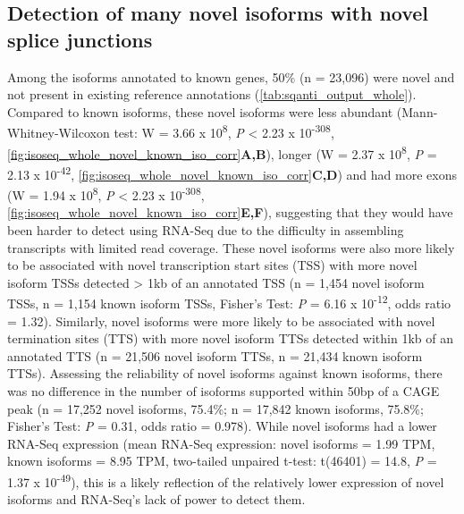 \subsection{Detection of many novel isoforms with novel splice junctions}
\label{sec:whole_novelIso}
Among the isoforms annotated to known genes, 50\% (n = 23,096) were novel and not present in existing reference annotations (\cref{tab:sqanti_output_whole}). Compared to known isoforms, these novel isoforms were less abundant (Mann-Whitney-Wilcoxon test: W = 3.66 x 10\textsuperscript{8}, \textit{P} < 2.23 x 10\textsuperscript{-308}, \cref{fig:isoseq_whole_novel_known_iso_corr}\textbf{A,B}), longer (W = 2.37 x 10\textsuperscript{8}, \textit{P} = 2.13 x 10\textsuperscript{-42}, \cref{fig:isoseq_whole_novel_known_iso_corr}\textbf{C,D}) and had more exons (W = 1.94 x 10\textsuperscript{8}, \textit{P} < 2.23 x 10\textsuperscript{-308}, \cref{fig:isoseq_whole_novel_known_iso_corr}\textbf{E,F}), suggesting that they would have been harder to detect using RNA-Seq due to the difficulty in assembling transcripts with limited read coverage. These novel isoforms were also more likely to be associated with novel transcription start sites (TSS) with more novel isoform TSSs detected > 1kb of an annotated TSS (n = 1,454 novel isoform TSSs, n = 1,154 known isoform TSSs, Fisher's Test: \textit{P} = 6.16 x 10\textsuperscript{-12}, odds ratio = 1.32). Similarly, novel isoforms were more likely to be associated with novel termination sites (TTS) with more novel isoform TTSs detected within 1kb of an annotated TTS (n = 21,506 novel isoform TTSs, n = 21,434 known isoform TTSs). Assessing the reliability of novel isoforms against known isoforms, there was no difference in the number of isoforms supported within 50bp of a CAGE peak (n = 17,252 novel isoforms, 75.4\%; n =  17,842 known isoforms, 75.8\%; Fisher's Test: \textit{P} = 0.31, odds ratio = 0.978). While novel isoforms had a lower RNA-Seq expression (mean RNA-Seq expression: novel isoforms = 1.99 TPM, known isoforms = 8.95 TPM, two-tailed unpaired t-test: t(46401) = 14.8, \textit{P} = 1.37 x 10\textsuperscript{-49}), this is a likely reflection of the relatively lower expression of novel isoforms and RNA-Seq's lack of power to detect them.


